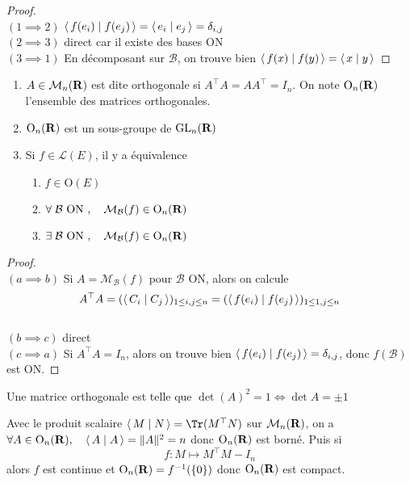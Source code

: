 \begin{proof}~\\
    $(1\implies 2)$ $ \scalar{f(e_i)}{f(e_j)} = \scalar{e_i}{e_j} =\delta_{i,j}$\\
    $(2\implies 3)$ direct car il existe des bases ON\\
    $(3\implies 1)$ En décomposant sur $\mathcal  B$, on trouve bien $\scalar{f(x)}{f(y)} = \scalar{x}{y} $
\end{proof}

\begin{thmdef}
\begin{enumerate}
    \item $A \in  \mathcal  M_n(\mathbf R)$ est dite orthogonale si $A^\top A=AA^\top=I_n$. On note  $\mathrm  O_n(\mathbf R)$ l'ensemble des matrices orthogonales.
    \item $\mathrm  O_n(\mathbf R)$ est un sous-groupe de $\mathrm {GL}_n(\mathbf R)$
    \item Si $f \in  \mathcal  L(E)$, il y a équivalence \begin{enumerate}
        \item $f \in  \mathrm  O(E)$
        \item $\forall  \; \mathcal  B \text{ ON }, \quad  \mathcal M_{\mathcal  B}(f) \in  \mathrm  O_n(\mathbf R)$
        \item $\exists  \; \mathcal  B \text{ ON }, \quad  \mathcal M_{\mathcal  B}(f) \in  \mathrm  O_n(\mathbf R)$
    \end{enumerate}
\end{enumerate}
\end{thmdef}

\begin{proof}
~\\ $(a\implies b)$ Si $A=\mathcal  M_{\mathcal  B}(f)$ pour $\mathcal  B$ ON, alors on calcule \[ A^\top A=( \scalar{C_i}{C_j}  )_{1\leq i,j\leq n}=( \scalar{f(e_i)}{f(e_j)}  )_{1\leq 1,j\leq n} \]\\
$(b\implies c)$ direct \\
$(c\implies a)$ Si $A^\top A=I_n$, alors on trouve bien  $\scalar{f(e_i)}{f(e_j)} =\delta_{i,j}$, donc $f(\mathcal  B)$ est ON.
\end{proof}

\begin{rem}
    Une matrice orthogonale est telle que $\det(A)^2=1 \iff  \det A=\pm1$
\end{rem}

\begin{rem}
    Avec le produit scalaire $\scalar{M}{N} = \Tr(M^\top N)$ sur $\mathcal  M_n(\mathbf R)$, on a $\forall  A \in  \mathrm  O_n(\R), \quad  \scalar{A}{A} = \|A\|^2 =n$ donc $\mathrm  O_n(\mathbf R)$ est borné. Puis si \[
    f:M\longmapsto M^\top M-I_n
    \] 
    alors $f$ est continue et  $\mathrm  O_n(\mathbf R)=f^{-1}(\left\{  0 \right\} )$ donc $\mathrm  O_n(\mathbf R)$ est compact.
\end{rem}

